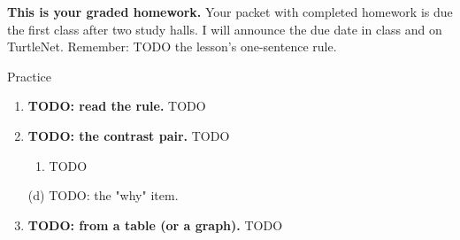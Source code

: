 \documentclass[12pt]{article}
\begin{document}

\vspace{0.10in}

\boxguard[8]
\begin{remindbox}
\small
\textbf{This is your graded homework.} Your packet with completed homework is due the first
class after two study halls. I will announce the due date in class and on TurtleNet. Remember:
TODO the lesson's one-sentence rule.
\end{remindbox}

\vspace{0.08in}

\begin{notesbox}{Practice}
\small
\begin{enumerate}[leftmargin=1.9em, itemsep=8pt]
  \item \textbf{TODO: read the rule.} TODO \blank{1.8cm}

  \boxguard[16]
  \item \textbf{TODO: the contrast pair.} TODO
    \begin{enumerate}[label=(\alph*), leftmargin=1.9em, itemsep=4pt]
      \item TODO \blank{1.4cm}
    \end{enumerate}
    (d) TODO: the "why" item. 

  \item \textbf{TODO: from a table (or a graph).} TODO
\end{enumerate}
\end{notesbox}
\end{document}
